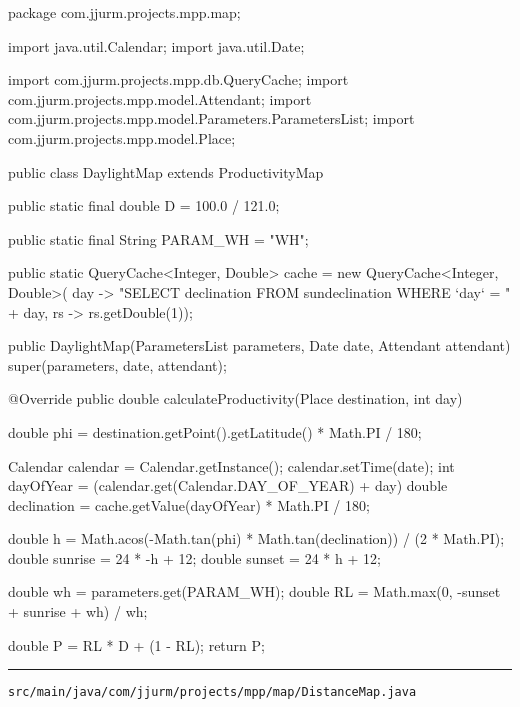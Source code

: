 \begin{javacode}
package com.jjurm.projects.mpp.map;

import java.util.Calendar;
import java.util.Date;

import com.jjurm.projects.mpp.db.QueryCache;
import com.jjurm.projects.mpp.model.Attendant;
import com.jjurm.projects.mpp.model.Parameters.ParametersList;
import com.jjurm.projects.mpp.model.Place;

public class DaylightMap extends ProductivityMap {

  public static final double D = 100.0 / 121.0;

  public static final String PARAM_WH = "WH";

  public static QueryCache<Integer, Double> cache = new QueryCache<Integer, Double>(
      day -> "SELECT declination FROM sundeclination WHERE `day` = " + day, rs -> rs.getDouble(1));

  public DaylightMap(ParametersList parameters, Date date, Attendant attendant) {
    super(parameters, date, attendant);
  }

  @Override
  public double calculateProductivity(Place destination, int day) {
    double phi = destination.getPoint().getLatitude() * Math.PI / 180;

    Calendar calendar = Calendar.getInstance();
    calendar.setTime(date);
    int dayOfYear = (calendar.get(Calendar.DAY_OF_YEAR) + day) %
    double declination = cache.getValue(dayOfYear) * Math.PI / 180;

    double h = Math.acos(-Math.tan(phi) * Math.tan(declination)) / (2 * Math.PI);
    double sunrise = 24 * -h + 12;
    double sunset = 24 * h + 12;

    double wh = parameters.get(PARAM_WH);
    double RL = Math.max(0, -sunset + sunrise + wh) / wh;

    double P = RL * D + (1 - RL);
    return P;
  }

}
\end{javacode}

\noindent\rule{\textwidth}{0.4pt}

\nointerlineskip
\texttt{src/main/java/com/jjurm/projects/mpp/map/DistanceMap.java}

